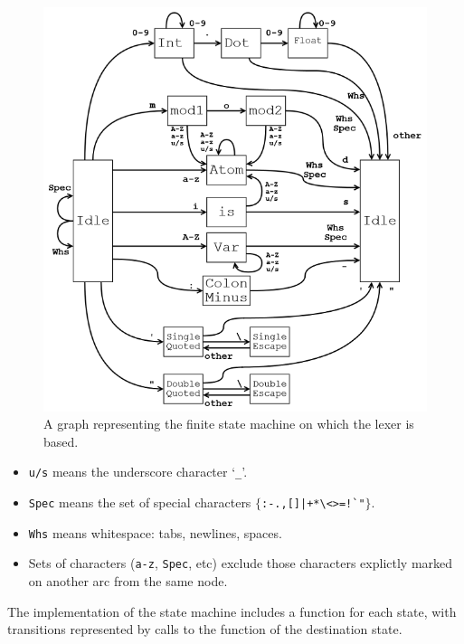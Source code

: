 \documentclass[12pt]{article}
\begin{document}
\begin{figure}[H]
\includegraphics{lex65.png}%
\caption{A graph representing the finite state machine on which the lexer is based.}
\end{figure}

\vspace{-16px}
\begin{itemize}
\item \verb|u/s| means the underscore character `\verb|_|'.\vspace{-4px}
\item \verb|Spec| means the set of special characters $\{$\verb/:-.,[]|+*\<>=!`"/$\}$.\vspace{-4px}
\item \verb|Whs| means whitespace: tabs, newlines, spaces.\vspace{-4px}
\item Sets of characters (\verb|a-z|, \verb|Spec|, etc) exclude those characters explictly marked on another arc from the same node.
\end{itemize}

\newpage

The implementation of the state machine includes a function for each state, with transitions represented by calls to the function of the destination state.
\end{document}
